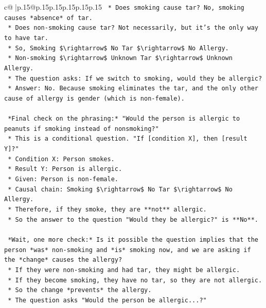 \documentclass{article}
\begin{document}
{\begin{supertabular}{c@{$\;$}|p{.15\linewidth}@{}p{.15\linewidth}p{.15\linewidth}p{.15\linewidth}p{.15\linewidth}p{.15\linewidth}}
{{{\texttt{    *   Does smoking cause tar? No, smoking causes *absence* of tar.} \\
\texttt{    *   Does non{-}smoking cause tar? Not necessarily, but it's the only way to have tar.} \\
\texttt{    *   So, Smoking \$\textbackslash{}rightarrow\$ No Tar \$\textbackslash{}rightarrow\$ No Allergy.} \\
\texttt{    *   Non{-}smoking \$\textbackslash{}rightarrow\$ Unknown Tar \$\textbackslash{}rightarrow\$ Unknown Allergy.} \\
\texttt{    *   The question asks: If we switch to smoking, would they be allergic?} \\
\texttt{    *   Answer: No. Because smoking eliminates the tar, and the only other cause of allergy is gender (which is non{-}female).} \\
\\ 
\texttt{    *Final check on the phrasing:* "Would the person is allergic to peanuts if smoking instead of nonsmoking?"} \\
\texttt{    *   This is a conditional question. "If {[}condition X{]}, then {[}result Y{]}?"} \\
\texttt{    *   Condition X: Person smokes.} \\
\texttt{    *   Result Y: Person is allergic.} \\
\texttt{    *   Given: Person is non{-}female.} \\
\texttt{    *   Causal chain: Smoking \$\textbackslash{}rightarrow\$ No Tar \$\textbackslash{}rightarrow\$ No Allergy.} \\
\texttt{    *   Therefore, if they smoke, they are **not** allergic.} \\
\texttt{    *   So the answer to the question "Would they be allergic?" is **No**.} \\
\\ 
\texttt{    *Wait, one more check:* Is it possible the question implies that the person *was* non{-}smoking and *is* smoking now, and we are asking if the *change* causes the allergy?} \\
\texttt{    *   If they were non{-}smoking and had tar, they might be allergic.} \\
\texttt{    *   If they become smoking, they have no tar, so they are not allergic.} \\
\texttt{    *   So the change *prevents* the allergy.} \\
\texttt{    *   The question asks "Would the person be allergic...?"} \\
}}}
\end{supertabular}}
\end{document}
